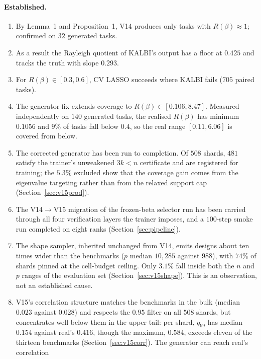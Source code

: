 \documentclass[11pt]{article}
\newcommand{\Rq}{R(\beta)}
\begin{document}
\paragraph{Established.}
\begin{enumerate}
\itemsep2pt
\item By Lemma~1 and Proposition~1, V14 produces only tasks with
      $\Rq \approx 1$; confirmed on $32$ generated tasks.
\item As a result the Rayleigh quotient of KALBI's output has a floor at
      $0.425$ and tracks the truth with slope $0.293$.
\item For $\Rq \in [0.3, 0.6]$, CV LASSO succeeds where KALBI fails
      ($705$ paired tasks).
\item The generator fix extends coverage to $\Rq \in [0.106, 8.47]$. Measured
      independently on $140$ generated tasks, the realised $\Rq$ has minimum
      $0.1056$ and $9\%$ of tasks fall below $0.4$, so the real range
      $[0.11, 6.06]$ is covered from below.
\item The corrected generator has been run to completion. Of $508$ shards,
      $481$ satisfy the trainer's unweakened $3k < n$ certificate and are
      registered for training; the $5.3\%$ excluded show that the coverage
      gain comes from the eigenvalue targeting rather than from the relaxed
      support cap (Section~\ref{sec:v15prod}).
\item The V14$\to$V15 migration of the frozen-beta selector run has been
      carried through all four verification layers the trainer imposes, and a
      $100$-step smoke run completed on eight ranks
      (Section~\ref{sec:pipeline}).
\item The shape sampler, inherited unchanged from V14, emits designs about ten
      times wider than the benchmarks ($p$ median $10{,}285$ against $988$),
      with $74\%$ of shards pinned at the cell-budget ceiling. Only $3.1\%$
      fall inside both the $n$ and $p$ ranges of the evaluation set
      (Section~\ref{sec:v15shape}). This is an observation, not an established
      cause.
\item V15's correlation structure matches the benchmarks in the bulk
      (median $0.023$ against $0.028$) and respects the $0.95$ filter on all
      $508$ shards, but concentrates well below them in the upper tail: per
      shard, $q_{99}$ has median $0.154$ against real's $0.416$, though the
      maximum, $0.584$, exceeds eleven of the thirteen benchmarks
      (Section~\ref{sec:v15corr}). The generator can reach real's correlation

\end{enumerate}
\end{document}
